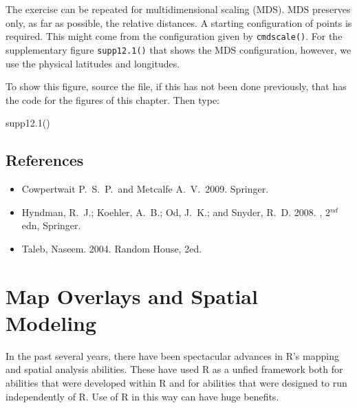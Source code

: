 \documentclass{tufte-book}\usepackage[]{graphicx}\usepackage[]{color}
\newcommand{\txtt}[1]{\texttt{#1}}
\newenvironment{itemizz}%
  {\begin{itemize} %
    \setlength{\itemsep}{2pt}%
    \setlength{\parskip}{2pt}} %
  {\end{itemize}}
\begin{document}
The exercise can be repeated for multidimensional scaling (MDS). MDS
preserves only, as far as possible, the relative distances.  A
starting configuration of points is required.  This might come from
the configuration given by \txtt{cmdscale()}.  For the supplementary
figure \txtt{supp12.1()} that shows the MDS configuration, however, we
use the physical latitudes and longitudes.

To show this figure, source the file, if this has not been done
previously, that has the code for the figures of this chapter. Then
type:
\begin{Schunk}
\begin{Sinput}
supp12.1()
\end{Sinput}
\end{Schunk}

\section*{References}
\begin{itemizz}
\item[] Cowpertwait P.~S.~P.\ and Metcalfe A.~V.\ 2009.
 Springer.
\item[]
Hyndman, R.~J.; Koehler, A.~B.; Od, J.~K.; and Snyder, R.~D. 2008.
, 2$^{nd}$ edn, Springer.
\item[] Taleb, Naseem. 2004.   Random House, 2ed.
\end{itemizz}
\cleartooddpage

\chapter{Map Overlays  and Spatial Modeling}\label{ch:spatial}




In the past several years, there have been spectacular advances in R's
mapping and spatial analysis abilities. These have used R as a unfied
framework both for abilities that were developed within R and for
abilities that were designed to run independently of R.  Use of R in
this way can have huge benefits.
\end{document}
